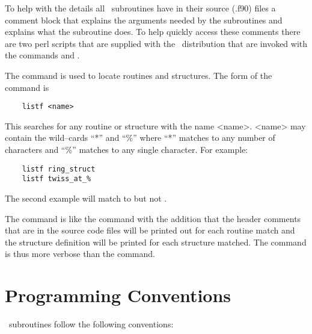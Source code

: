 To help with the details all \bmad\ subroutines have in their source (.f90)
files a comment block that explains the arguments needed by the
subroutines and explains what the subroutine does. To help quickly
access these comments there are two perl scripts that are supplied
with the \bmad\ distribution that are invoked with the commands
 and .

The  command is used to locate routines and structures.
The form of the command is
\begin{verbatim}
    listf <name>
\end{verbatim}
This searches for any routine or structure with the name
<name>. <name> may contain the wild--cards ``*'' and ``\%'' where
``*'' matches to any number of characters and ``\%'' matches to any
single character. For example:
\begin{verbatim}
    listf ring_struct
    listf twiss_at_%
\end{verbatim}
The second example will match to  but not
.

The  command is like the  command with the
addition that the header comments that are in the source code files
will be printed out for each routine match and the structure definition
will be printed for each structure matched. The  command is
thus more verbose than the  command.

\section{Programming Conventions}

\bmad\ subroutines follow the following conventions:

